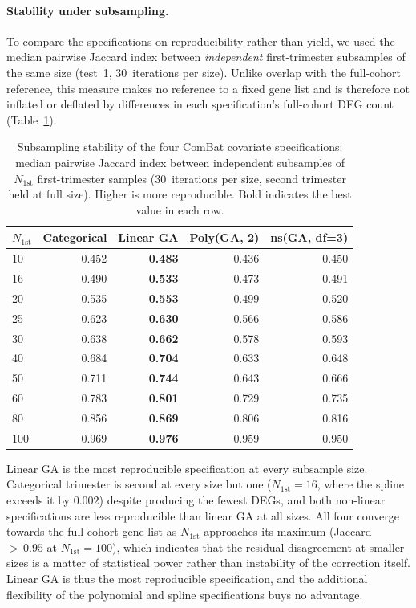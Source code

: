\documentclass[11pt,a4paper]{article}
\begin{document}
\paragraph{Stability under subsampling.}
To compare the specifications on reproducibility rather than
yield, we used the median pairwise Jaccard index between
\emph{independent} first-trimester subsamples of the same size
(test~1, 30~iterations per size). Unlike overlap with the
full-cohort reference, this measure makes no reference to a
fixed gene list and is therefore not inflated or deflated by
differences in each specification's full-cohort DEG count
(Table~\ref{tab:supp-covariate-jaccard}).

\begin{table}[htbp]
\centering
\footnotesize
\begin{tabular}{@{}lrrrr@{}}
\toprule
$N_{1\text{st}}$ & \textbf{Categorical} & \textbf{Linear GA} &
  \textbf{Poly(GA, 2)} & \textbf{ns(GA, df=3)} \\
\midrule
10  & 0.452 & \textbf{0.483} & 0.436 & 0.450 \\
16  & 0.490 & \textbf{0.533} & 0.473 & 0.491 \\
20  & 0.535 & \textbf{0.553} & 0.499 & 0.520 \\
25  & 0.623 & \textbf{0.630} & 0.566 & 0.586 \\
30  & 0.638 & \textbf{0.662} & 0.578 & 0.593 \\
40  & 0.684 & \textbf{0.704} & 0.633 & 0.648 \\
50  & 0.711 & \textbf{0.744} & 0.643 & 0.666 \\
60  & 0.783 & \textbf{0.801} & 0.729 & 0.735 \\
80  & 0.856 & \textbf{0.869} & 0.806 & 0.816 \\
100 & 0.969 & \textbf{0.976} & 0.959 & 0.950 \\
\bottomrule
\end{tabular}
\caption{Subsampling stability of the four ComBat covariate
  specifications: median pairwise Jaccard index between
  independent subsamples of $N_{1\text{st}}$ first-trimester
  samples (30~iterations per size, second trimester held at full
  size). Higher is more reproducible. Bold indicates the best
  value in each row.}
\label{tab:supp-covariate-jaccard}
\end{table}

Linear GA is the most reproducible specification at every
subsample size. Categorical trimester is second at every size
but one ($N_{1\text{st}}\!=\!16$, where the spline exceeds it by
$0.002$) despite producing the fewest DEGs, and both non-linear
specifications are less reproducible than linear GA at all sizes.
All four converge towards the full-cohort gene list as
$N_{1\text{st}}$ approaches its maximum (Jaccard ${>}\,0.95$ at
$N_{1\text{st}}\!=\!100$), which indicates that the residual
disagreement at smaller sizes is a matter of statistical power
rather than instability of the correction itself. Linear GA is thus
the most reproducible specification, and the additional
flexibility of the polynomial and spline specifications buys
no advantage.
\end{document}
